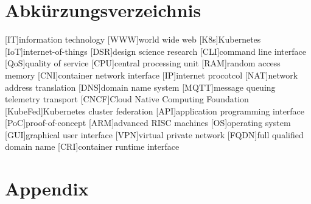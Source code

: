 \documentclass[MSC,Master,english]{twbook}%
\providecommand\listacroname{}
\renewcommand\listacroname{List of Abbreviations}
\renewcommand\listacroname{Abkürzungsverzeichnis}
\begin{document}
\chapter*{\listacroname}
\begin{acronym}[XXXXX]
    [IT]{information technology}
    [WWW]{world wide web}
    [K8s]{Kubernetes}
    [IoT]{internet-of-things}
    [DSR]{design science research}
    [CLI]{command line interface}
    [QoS]{quality of service}
    [CPU]{central processing unit}
    [RAM]{random access memory}
    [CNI]{container network interface}
    [IP]{internet procotcol}
    [NAT]{network address translation}
    [DNS]{domain name system}
    [MQTT]{message queuing telemetry transport}
    [CNCF]{Cloud Native Computing Foundation}
    [KubeFed]{Kubernetes cluster federation}
    [API]{application programming interface}
    [PoC]{proof-of-concept}
    [ARM]{advanced RISC machines}
    [OS]{operating system}
    [GUI]{graphical user interface}
    [VPN]{virtual private network}
    [FQDN]{full qualified domain name}
    [CRI]{container runtime interface}
\end{acronym}

%
%
\clearpage
\appendix
\chapter{Appendix}
\end{document}

